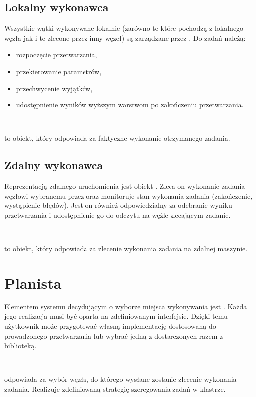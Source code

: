 \subsection{Lokalny wykonawca}

Wszystkie wątki wykonywane lokalnie (zarówno te które pochodzą z lokalnego
węzła jak i te zlecone przez inny węzeł) są zarządzane przez .
Do zadań  należą:
\begin{itemize}
\item rozpoczęcie przetwarzania, 
\item przekierowanie parametrów, 
\item przechwycenie wyjątków,
\item udostępnienie wyników wyższym warstwom po zakończeniu przetwarzania.\end{itemize}
\begin{defn}
~

\noindent {} to obiekt, który odpowiada
za faktyczne wykonanie otrzymanego zadania.
\end{defn}

\subsection{Zdalny wykonawca}

Reprezentacją zdalnego uruchomienia 
jest obiekt . Zleca on wykonanie zadania
węzłowi wybranemu przez  oraz monitoruje stan
wykonania zadania (zakończenie, wystąpienie błędów). Jest on również
odpowiedzialny za odebranie wyniku przetwarzania i udostępnienie go
do odczytu na węźle zlecającym zadanie.
\begin{defn}
~

\noindent {} to obiekt, który odpowiada
za zlecenie wykonania zadania na zdalnej maszynie.
\end{defn}

\section{Planista}

Elementem systemu decydującym o wyborze miejsca wykonywania 
jest . Każda jego realizacja musi być oparta na
zdefiniowanym interfejsie. Dzięki temu użytkownik może przygotować
własną implementację  dostosowaną do prowadzonego
przetwarzania lub wybrać jedną z dostarczonych razem z biblioteką.
\begin{defn}
~

\noindent {} odpowiada za wybór węzła, do którego
wysłane zostanie zlecenie wykonania zadania. Realizuje zdefiniowaną
strategię szeregowania zadań w klastrze.
\end{defn}

